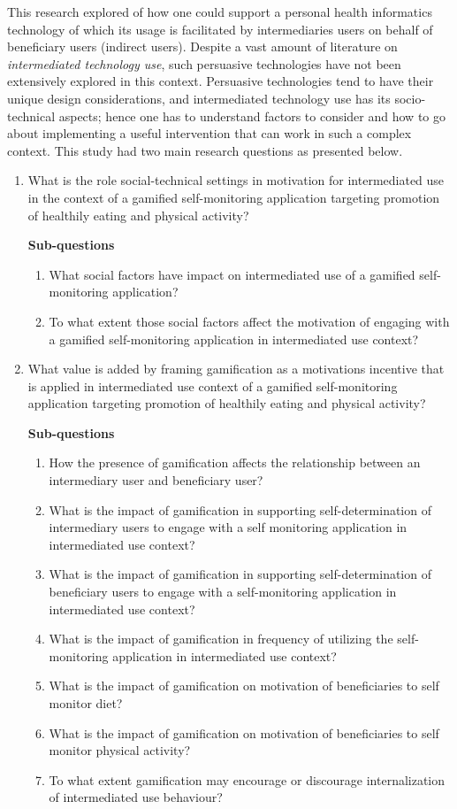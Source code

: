 This research explored of how one could support a personal health informatics technology of which its usage is facilitated by intermediaries users on behalf of beneficiary users (indirect users). Despite a vast amount of literature on \emph{intermediated technology use}, such persuasive technologies have not been extensively explored in this context. Persuasive technologies tend to have their unique design considerations, and intermediated technology use has its socio-technical aspects; hence one has to understand factors to consider and how to go about implementing a useful intervention that can work in such a complex context. This study had two main research questions as presented below.
\begin{enumerate}
\item What is the role social-technical settings in motivation for intermediated use in the context of a gamified self-monitoring application targeting promotion of healthily eating and physical activity?

\textbf{Sub-questions}
\begin{enumerate}[label=\alph*.]
\item What social factors have impact on intermediated use of a gamified self-monitoring application?
\item To what extent those social factors affect the motivation of engaging with a gamified self-monitoring application in intermediated use context?
\end{enumerate}
\item What value is added by framing gamification as a motivations incentive that is applied in intermediated use context of a gamified self-monitoring application targeting promotion of healthily eating and physical activity?

\textbf{Sub-questions}
\begin{enumerate}[label=\alph*.]
\item How the presence of gamification affects the relationship between an intermediary user and beneficiary user?
\item What is the impact of gamification in supporting self-determination of intermediary users to engage with a self monitoring application in intermediated use context?
\item What is the impact of gamification in supporting self-determination of beneficiary users to engage with a self-monitoring application in intermediated use context?
\item What is the impact of gamification in frequency of utilizing the self-monitoring application in intermediated use context?
\item What is the impact of gamification on motivation of beneficiaries to self monitor diet?
\item What is the impact of gamification on motivation of beneficiaries to self monitor physical activity?
\item To what extent gamification may encourage or discourage internalization of intermediated use behaviour?
\end{enumerate}
\end{enumerate}  
